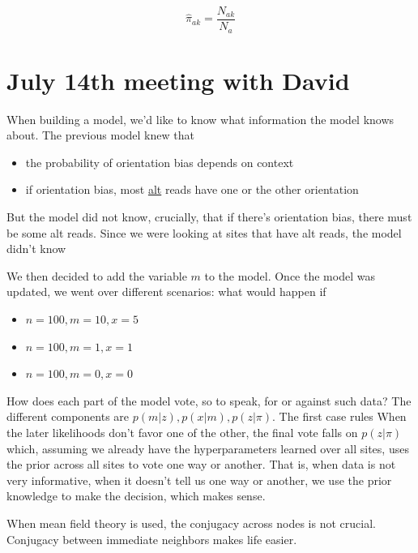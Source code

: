 \documentclass[a4paper]{article}
\begin{document}
\begin{equation}
\hat{\pi}_{ak} = \frac{N_{ak}}{N_a}
\end{equation}




\section{July 14th meeting with David}

When building a model, we'd like to know what information the model knows about. The previous model knew that 

\begin{itemize}
\item the probability of orientation bias depends on context
\item if orientation bias, most \underline{alt} reads have one or the other orientation
\end{itemize}

But the model did not know, crucially, that if there's orientation bias, there must be some alt reads. Since we were looking at sites that have alt reads, the model didn't know 

We then decided to add the variable $m$ to the model.  Once the model was updated, we went over different scenarios: what would happen if 
\begin{itemize}
\item $n = 100, m = 10, x = 5$ 
\item $n = 100, m = 1, x = 1$
\item $n = 100, m = 0, x = 0$
\end{itemize}

How does each part of the model vote, so to speak, for or against such data? The different components are $p(m|z), p(x|m), p(z | \pi)$. The first case rules 
When the later likelihoods don't favor one of the other, the final vote falls on $p(z | \pi)$ which, assuming we already have the hyperparameters learned over all sites, uses the prior across all sites to vote one way or another. That is, when data is not very informative, when it doesn't tell us one way or another, we use the prior knowledge to make the decision, which makes sense.

When mean field theory is used, the conjugacy across nodes is not crucial. Conjugacy between immediate neighbors makes life easier.
\end{document}
